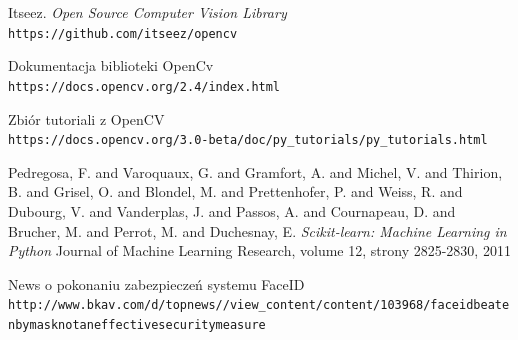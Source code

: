 \documentclass[oneside, eng]{mgr}
\begin{document}
\begin{thebibliography}{9}
Itseez.
\textit{Open Source Computer Vision Library}
\\\texttt{https://github.com/itseez/opencv}

Dokumentacja biblioteki OpenCv 
\\\texttt{https://docs.opencv.org/2.4/index.html}

Zbiór tutoriali z OpenCV
\\\texttt{https://docs.opencv.org/3.0-beta/doc/py\_tutorials/py\_tutorials.html}

Pedregosa, F. and Varoquaux, G. and Gramfort, A. and Michel, V.
         and Thirion, B. and Grisel, O. and Blondel, M. and Prettenhofer, P.
         and Weiss, R. and Dubourg, V. and Vanderplas, J. and Passos, A. and
         Cournapeau, D. and Brucher, M. and Perrot, M. and Duchesnay, E.
 \textit{Scikit-learn: Machine Learning in {P}ython}
 Journal of Machine Learning Research, volume 12, strony 2825-2830, 2011

News o pokonaniu zabezpieczeń systemu FaceID
\\\texttt{http://www.bkav.com/d/top\-news/\-/view\_content/content/103968/face\-id\-beaten\-by\-mask\-not\-an\-effective\-security\-measure}

\end{thebibliography}

\tableofcontents

\listoffigures
\end{document}
